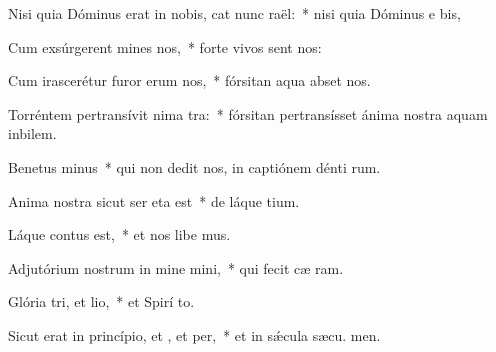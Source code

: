 \item Nisi quia Dóminus erat in nobis, cat nunc raël:~* nisi quia Dóminus e  bis,
\item Cum exsúrgerent mines  nos,~* forte vivos sent nos:
\item Cum irascerétur furor erum  nos,~* fórsitan aqua abset nos.
\item Torréntem pertransívit nima tra:~* fórsitan pertransísset ánima nostra aquam inbilem.
\item Benetus minus~* qui non dedit nos, in captiónem dénti rum.
\item Anima nostra sicut ser eta est~* de láque tium.
\item Láque contus est,~* et nos libe mus.
\item Adjutórium nostrum in mine mini,~* qui fecit cæ  ram.
\item Glória tri, et lio,~* et Spirí to.
\item Sicut erat in princípio, et , et per,~* et in sǽcula sæcu. men.
